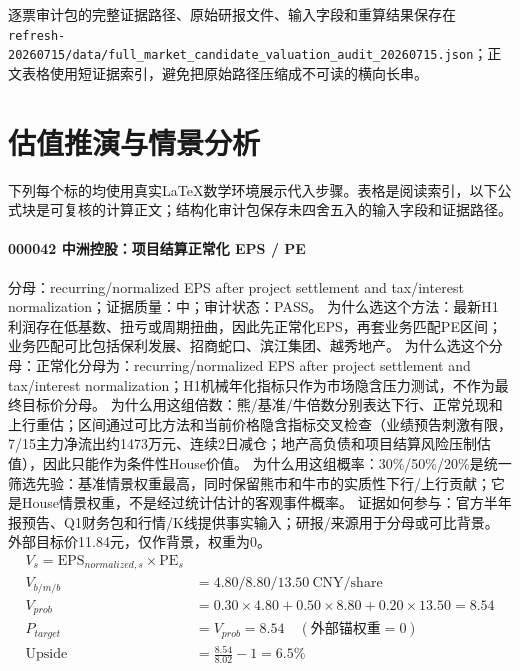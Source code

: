 逐票审计包的完整证据路径、原始研报文件、输入字段和重算结果保存在\texttt{refresh-20260715/data/full\_market\_candidate\_valuation\_audit\_20260715.json}；正文表格使用短证据索引，避免把原始路径压缩成不可读的横向长串。
\section{估值推演与情景分析}

下列每个标的均使用真实LaTeX数学环境展示代入步骤。表格是阅读索引，以下公式块是可复核的计算正文；结构化审计包保存未四舍五入的输入字段和证据路径。

\scriptsize
\paragraph{000042 中洲控股：项目结算正常化 EPS / PE}
分母：recurring/normalized EPS after project settlement and tax/interest normalization；证据质量：中；审计状态：PASS。
为什么选这个方法：最新H1利润存在低基数、扭亏或周期扭曲，因此先正常化EPS，再套业务匹配PE区间；业务匹配可比包括保利发展、招商蛇口、滨江集团、越秀地产。
为什么选这个分母：正常化分母为：recurring/normalized EPS after project settlement and tax/interest normalization；H1机械年化指标只作为市场隐含压力测试，不作为最终目标价分母。
为什么用这组倍数：熊/基准/牛倍数分别表达下行、正常兑现和上行重估；区间通过可比方法和当前价格隐含指标交叉检查（业绩预告刺激有限，7/15主力净流出约1473万元、连续2日减仓；地产高负债和项目结算风险压制估值），因此只能作为条件性House价值。
为什么用这组概率：30\%/50\%/20\%是统一筛选先验：基准情景权重最高，同时保留熊市和牛市的实质性下行/上行贡献；它是House情景权重，不是经过统计估计的客观事件概率。
证据如何参与：官方半年报预告、Q1财务包和行情/K线提供事实输入；研报/来源用于分母或可比背景。外部目标价11.84元，仅作背景，权重为0。
\begin{align*}
V_s=\mathrm{EPS}_{normalized,s}\times \mathrm{PE}_s\\
V_{b/m/b} &= 4.80/8.80/13.50\ \mathrm{CNY/share}\\
V_{prob} &= 0.30\times 4.80+0.50\times 8.80+0.20\times 13.50=8.54\\
P_{target} &= V_{prob}=8.54\quad(\text{外部锚权重}=0)\\
\mathrm{Upside} &= \frac{8.54}{8.02}-1=6.5\%\\
\end{align*}

